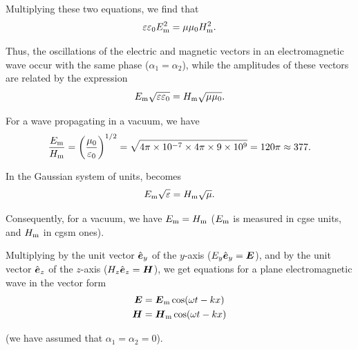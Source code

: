 \noindent
Multiplying these two equations, we find that
\begin{equation}\label{eq:15_21}
    \varepsilon\varepsilon_0 E_{\text{m}}^2 = \mu\mu_0 H_{\text{m}}^2.
\end{equation}

\noindent
Thus, the oscillations of the electric and magnetic vectors in an electromagnetic wave occur with the same phase ($\alpha_1=\alpha_2$), while the amplitudes of these vectors are related by the expression
\begin{equation}\label{eq:15_22}
    E_{\text{m}} \sqrt{\varepsilon\varepsilon_0} = H_{\text{m}} \sqrt{\mu\mu_0}.
\end{equation}

\noindent
For a wave propagating in a vacuum, we have
\begin{equation}\label{eq:15_23}
    \frac{E_{\text{m}}}{H_{\text{m}}} = \left(\frac{\mu_0}{\varepsilon_0}\right)^{1/2} = \sqrt{4\pi \times \num{e-7} \times 4\pi \times \num{9e9}} = 120\pi \approx 377.
\end{equation}

\noindent
In the Gaussian system of units,  becomes
\begin{equation}\label{eq:15_24}
    E_{\text{m}} \sqrt{\varepsilon} = H_{\text{m}} \sqrt{\mu}.
\end{equation}

Consequently, for a vacuum, we have $E_{\text{m}}=H_{\text{m}}$ ($E_{\text{m}}$ is measured in cgse units, and $H_{\text{m}}$ in cgsm ones).

Multiplying  by the unit vector $\hat{\boldsymbol{e}}_{y}$ of the $y$-axis ($E_y\hat{\boldsymbol{e}}_{y}=\boldsymbol{E}$), and  by the unit vector $\hat{\boldsymbol{e}}_{z}$ of the $z$-axis ($H_z\hat{\boldsymbol{e}}_{z}=\boldsymbol{H}$), we get equations for a plane electromagnetic wave in the vector form
\begin{equation}\label{eq:15_25}
    \begin{split}
        \boldsymbol{E} &= \boldsymbol{E}_{\text{m}} \cos(\omega t - kx)\\
        \boldsymbol{H} &= \boldsymbol{H}_{\text{m}} \cos(\omega t - kx)
    \end{split}
\end{equation}

\noindent
(we have assumed that $\alpha_1=\alpha_2=0$).

